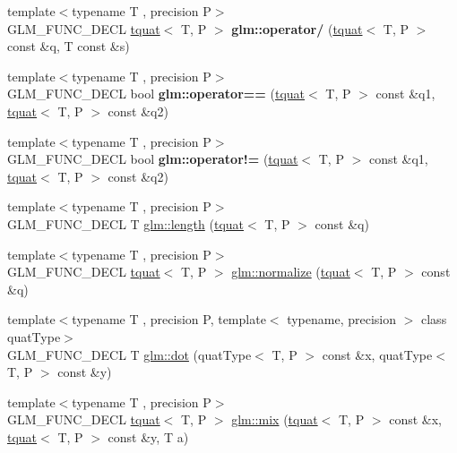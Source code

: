 \begin{DoxyCompactItemize}
\mbox{\label{group__gtc__quaternion_gab52fd3ac627908aa2aa1df96ddcdd113}} 
{\footnotesize template$<$typename T , precision P$>$ }\\G\+L\+M\+\_\+\+F\+U\+N\+C\+\_\+\+D\+E\+CL \hyperlink{structglm_1_1tquat}{tquat}$<$ T, P $>$ {\bfseries glm\+::operator/} (\hyperlink{structglm_1_1tquat}{tquat}$<$ T, P $>$ const \&q, T const \&s)
\item 
\mbox{\label{group__gtc__quaternion_ga7070e4e3cfdac395b3392219a365d95b}} 
{\footnotesize template$<$typename T , precision P$>$ }\\G\+L\+M\+\_\+\+F\+U\+N\+C\+\_\+\+D\+E\+CL bool {\bfseries glm\+::operator==} (\hyperlink{structglm_1_1tquat}{tquat}$<$ T, P $>$ const \&q1, \hyperlink{structglm_1_1tquat}{tquat}$<$ T, P $>$ const \&q2)
\item 
\mbox{\label{group__gtc__quaternion_gacbe1e859eb6558097bac5ec45955c60a}} 
{\footnotesize template$<$typename T , precision P$>$ }\\G\+L\+M\+\_\+\+F\+U\+N\+C\+\_\+\+D\+E\+CL bool {\bfseries glm\+::operator!=} (\hyperlink{structglm_1_1tquat}{tquat}$<$ T, P $>$ const \&q1, \hyperlink{structglm_1_1tquat}{tquat}$<$ T, P $>$ const \&q2)
\item 
{\footnotesize template$<$typename T , precision P$>$ }\\G\+L\+M\+\_\+\+F\+U\+N\+C\+\_\+\+D\+E\+CL T \hyperlink{group__gtc__quaternion_gac682181783027544c8d251b4d3a60cf8}{glm\+::length} (\hyperlink{structglm_1_1tquat}{tquat}$<$ T, P $>$ const \&q)
\item 
{\footnotesize template$<$typename T , precision P$>$ }\\G\+L\+M\+\_\+\+F\+U\+N\+C\+\_\+\+D\+E\+CL \hyperlink{structglm_1_1tquat}{tquat}$<$ T, P $>$ \hyperlink{group__gtc__quaternion_ga35b6bcb22ac6d1e4a85440f5b69bdf86}{glm\+::normalize} (\hyperlink{structglm_1_1tquat}{tquat}$<$ T, P $>$ const \&q)
\item 
{\footnotesize template$<$typename T , precision P, template$<$ typename, precision $>$ class quat\+Type$>$ }\\G\+L\+M\+\_\+\+F\+U\+N\+C\+\_\+\+D\+E\+CL T \hyperlink{group__gtc__quaternion_gac54dfc83de465a2d03e90d342242ab3d}{glm\+::dot} (quat\+Type$<$ T, P $>$ const \&x, quat\+Type$<$ T, P $>$ const \&y)
\item 
{\footnotesize template$<$typename T , precision P$>$ }\\G\+L\+M\+\_\+\+F\+U\+N\+C\+\_\+\+D\+E\+CL \hyperlink{structglm_1_1tquat}{tquat}$<$ T, P $>$ \hyperlink{group__gtc__quaternion_ga31cc82178742c36450f5662bd4fb30b0}{glm\+::mix} (\hyperlink{structglm_1_1tquat}{tquat}$<$ T, P $>$ const \&x, \hyperlink{structglm_1_1tquat}{tquat}$<$ T, P $>$ const \&y, T a)

\end{DoxyCompactItemize}
